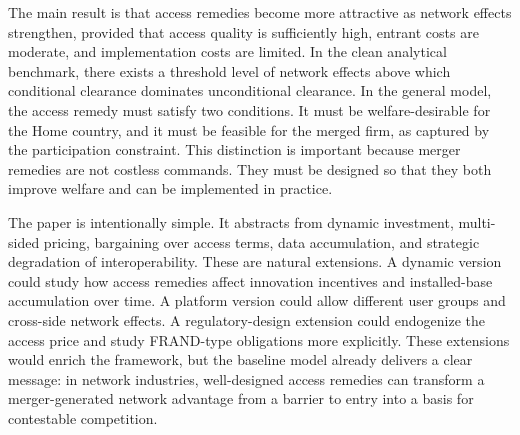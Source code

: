 \documentclass[12pt]{article}
\begin{document}
The main result is that access remedies become more attractive as network effects strengthen, provided that access quality is sufficiently high, entrant costs are moderate, and implementation costs are limited. In the clean analytical benchmark, there exists a threshold level of network effects above which conditional clearance dominates unconditional clearance. In the general model, the access remedy must satisfy two conditions. It must be welfare-desirable for the Home country, and it must be feasible for the merged firm, as captured by the participation constraint. This distinction is important because merger remedies are not costless commands. They must be designed so that they both improve welfare and can be implemented in practice.

The paper is intentionally simple. It abstracts from dynamic investment, multi-sided pricing, bargaining over access terms, data accumulation, and strategic degradation of interoperability. These are natural extensions. A dynamic version could study how access remedies affect innovation incentives and installed-base accumulation over time. A platform version could allow different user groups and cross-side network effects. A regulatory-design extension could endogenize the access price and study FRAND-type obligations more explicitly. These extensions would enrich the framework, but the baseline model already delivers a clear message: in network industries, well-designed access remedies can transform a merger-generated network advantage from a barrier to entry into a basis for contestable competition.
\end{document}

